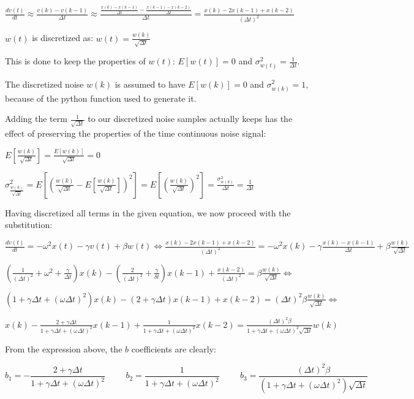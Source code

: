 \documentclass[11pt]{article}
\begin{document}
\(\frac{dv(t)}{dt} \approx \frac{v(k) - v(k-1)}{\Delta t} \approx \frac{\frac{x(k) - x(k-1)}{\Delta t} - \frac{x(k-1) - x(k-2)}{\Delta t}}{\Delta t} = \frac{x(k) - 2x(k-1) + x(k-2)}{(\Delta t)^2}\)

    \(w(t)\) is discretized as: \(w(t) = \frac{w(k)}{\sqrt{\Delta t}}\)

This is done to keep the properties of \(w(t)\): \(E[w(t)] = 0\) and
\(\sigma_{w(t)}^2 = \frac{1}{\Delta t}\).

The discretized noise \(w(k)\) is assumed to have \(E[w(k)] = 0\) and
\(\sigma_{w(k)}^2 = 1\), because of the python function used to generate
it.

Adding the term \(\frac{1}{\sqrt{\Delta t}}\) to our discretized noise
samples actually keeps has the effect of preserving the properties of
the time continuous noise signal:

\(E\left[\frac{w(k)}{\sqrt{\Delta t}}\right] = \frac{E[w(k)]}{\sqrt{\Delta t}} = 0\)

\(\sigma_{\frac{w(k)}{\sqrt{\Delta t}}}^2 = E \left[ \left( \frac{w(k)}{\sqrt{\Delta t}} - E\left[\frac{w(k)}{\sqrt{\Delta t}}\right]\right)^2\right] = E \left[ \left( \frac{w(k)}{\sqrt{\Delta t}}\right)^2\right] = \frac{\sigma_{w(k)}^2}{\Delta t} = \frac{1}{\Delta t}\)

    Having discretized all terms in the given equation, we now proceed with
the substitution:

\(\frac{dv(t)}{dt} = -\omega^2 x(t) - \gamma v(t) + \beta w(t) \Leftrightarrow \frac{x(k) - 2x(k-1) + x(k-2)}{(\Delta t)^2} = - \omega^2 x(k) - \gamma \frac{x(k) - x(k-1)}{\Delta t} + \beta \frac{w(k)}{\sqrt{\Delta t}}\)

    \((\frac{1}{(\Delta t)^2} + \omega^2 + \frac{\gamma}{\Delta t})x(k) - (\frac{2}{(\Delta t)^2} + \frac{\gamma}{\delta t})x(k-1) + \frac{x(k-2)}{(\Delta t)^2} = \beta \frac{w(k)}{\sqrt{\Delta t}} \Leftrightarrow\)

\((1 + \gamma \Delta t + (\omega \Delta t)^2)x(k) - (2 + \gamma \Delta t)x(k-1) + x(k-2) = (\Delta t)^2 \beta \frac{w(k)}{\sqrt{\Delta t}} \Leftrightarrow\)

\(x(k) - \frac{2 + \gamma \Delta t}{1 + \gamma \Delta t + (\omega \Delta t)^2}x(k-1) + \frac{1}{1 + \gamma \Delta t + (\omega \Delta t)^2}x(k-2) = \frac{(\Delta t)^2 \beta }{1 + \gamma \Delta t + (\omega \Delta t)^2 \sqrt{\Delta t} }w(k)\)

From the expression above, the \(b\) coefficients are clearly:

\[b_1 = -\frac{2 + \gamma \Delta t}{1 + \gamma \Delta t + (\omega \Delta t)^2} \hspace{1cm}
b_2 = \frac{1}{1 + \gamma \Delta t + (\omega \Delta t)^2} \hspace{1cm}
b_3 = \frac{(\Delta t)^2 \beta }{(1 + \gamma \Delta t + (\omega \Delta t)^2) \sqrt{\Delta t}} \]
\end{document}
